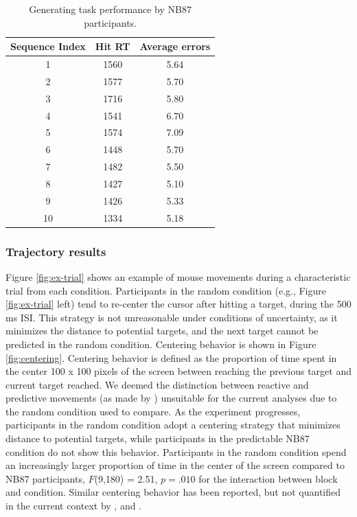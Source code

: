 \documentclass[man,floatsintext]{apa6}
\begin{document}
\begin{table}[h]
\begin{center} 
\caption{Generating task performance by NB87 participants.} 
\label{test-table} 
\vskip 0.12in
\begin{tabular}{c c c} 
\hline
Sequence Index  &  Hit RT  &  Average errors  \\ %
\hline
1  &  1560 &  5.64  \\
2  &  1577 &  5.70  \\
3  &  1716 &  5.80  \\
4  &  1541 &  6.70  \\ 
5  &  1574 &  7.09  \\ 
6  &  1448 &  5.70  \\ 
7  &  1482 &  5.50  \\ 
8  &  1427 &  5.10  \\ 
9  &  1426 &  5.33  \\ 
10 & 1334 &  5.18  \\
\hline
\end{tabular} 
\end{center} 
\end{table} 


\subsubsection{Trajectory results}

Figure \ref{fig:ex-trial} shows an example of mouse movements during a characteristic trial from each condition. Participants in the random condition (e.g., Figure \ref{fig:ex-trial} left) tend to re-center the cursor after hitting a target, during the 500 ms ISI. This strategy is not unreasonable under conditions of uncertainty, as it minimizes the distance to potential targets, and the next target cannot be predicted in the random condition. Centering behavior is shown in Figure \ref{fig:centering}. Centering behavior is defined as the proportion of time spent in the center 100 x 100 pixels of the screen between reaching the previous target and current target reached. We deemed the distinction between reactive and predictive movements (as made by ) unsuitable for the current analyses due to the random condition used to compare. As the experiment progresses, participants in the random condition adopt a centering strategy that minimizes distance to potential targets, while participants in the predictable NB87 condition do not show this behavior. Participants in the random condition spend an increasingly larger proportion of time in the center of the screen compared to NB87 participants, $F$(9,180) = 2.51, $p = .010$ for the interaction between block and condition. Similar centering behavior has been reported, but not quantified in the current context by , and .
\end{document}
